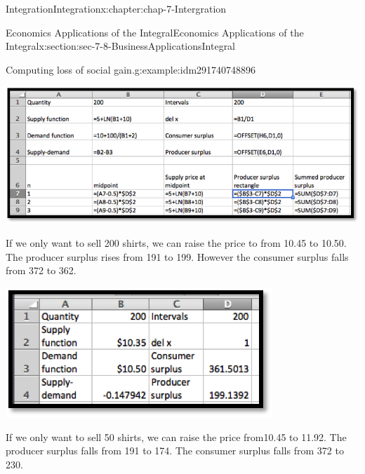 \documentclass[oneside,10pt,]{book}
\numberwithin{equation}{section}
\begin{document}
\begin{chapterptx}{Integration}{}{Integration}{}{}{x:chapter:chap-7-Intergration}
\begin{sectionptx}{Economics Applications of the Integral}{}{Economics Applications of the Integral}{}{}{x:section:sec-7-8-BusinessApplicationsIntegral}
\begin{example}{Computing loss of social gain.}{g:example:idm291740748896}
\begin{sidebyside}{1}{0.1}{0.1}{0}%
\begin{sbspanel}{0.8}%
\includegraphics[width=\linewidth]{images/sec7-8-10.png}
\end{sbspanel}%
\end{sidebyside}%
\par
If we only want to sell 200 shirts, we can raise the price to from \textdollar{}10.45 to \textdollar{}10.50.  The producer surplus rises from \textdollar{}191 to \textdollar{}199.  However the consumer surplus falls from \textdollar{}372 to \textdollar{}362.%
\begin{sidebyside}{1}{0.25}{0.25}{0}%
\begin{sbspanel}{0.5}%
\includegraphics[width=\linewidth]{images/sec7-8-11.png}
\end{sbspanel}%
\end{sidebyside}%
\par
If we only want to sell 50 shirts, we can raise the price from\textdollar{}10.45 to \textdollar{}11.92.  The producer surplus falls from \textdollar{}191 to \textdollar{}174.  The consumer surplus falls from \textdollar{}372 to \textdollar{}230.%
\begin{sidebyside}{1}{0.25}{0.25}{0}%
\begin{sbspanel}{0.5}%

\end{sbspanel}
\end{sidebyside}
\end{example}
\end{sectionptx}
\end{chapterptx}
\end{document}
